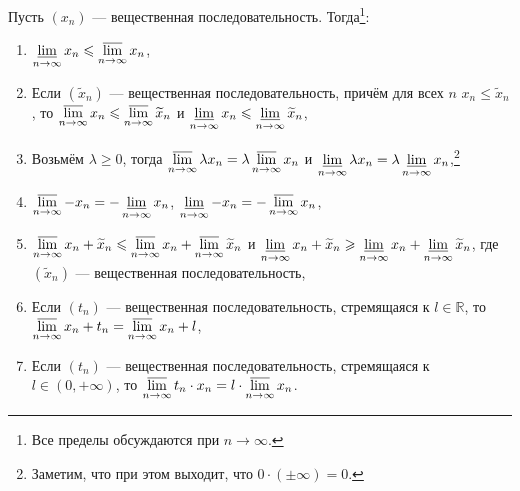\begin{theorem}
	Пусть \((x_n)\) --- вещественная последовательность. Тогда\footnote{Все пределы обсуждаются при \(n \to \infty\).}:
	\begin{enumerate}
		\item \(\varliminf\limits_{n \to \infty} x_n \leqslant \varlimsup\limits_{n \to \infty} x_n\),
		\item Если \((\widetilde{x}_n)\) --- вещественная последовательность, причём для всех \(n\) \(x_n \leqslant \widetilde{x}_n\), то \(\varlimsup\limits_{n \to \infty} x_n \leqslant \varlimsup\limits_{n \to \infty} \widetilde{x}_n\) и \(\varliminf\limits_{n \to \infty} x_n \leqslant \varliminf\limits_{n \to \infty} \widetilde{x}_n\),
		\item Возьмём \(\lambda \geqslant 0\), тогда \(\varlimsup\limits_{n \to \infty} \lambda x_n = \lambda \varlimsup\limits_{n \to \infty} x_n\) и \(\varliminf\limits_{n \to \infty} \lambda x_n = \lambda \varliminf\limits_{n \to \infty} x_n\),\footnote{Заметим, что при этом выходит, что \(0 \cdot (\pm \infty) = 0\).}
		\item \(\varlimsup\limits_{n \to \infty} -x_n = -\varliminf\limits_{n \to \infty} x_n\), \(\varliminf\limits_{n \to \infty} -x_n = -\varlimsup\limits_{n \to \infty} x_n\),
		\item \(\varlimsup\limits_{n \to \infty} x_n + \widetilde{x}_n \leqslant \varlimsup\limits_{n \to \infty} x_n + \varlimsup\limits_{n \to \infty} \widetilde{x}_n\) и \(\varliminf\limits_{n \to \infty} x_n + \widetilde{x}_n \geqslant \varliminf\limits_{n \to \infty} x_n + \varliminf\limits_{n \to \infty} \widetilde{x}_n\), где \((\widetilde{x}_n)\) --- вещественная последовательность,
		\item Если \((t_n)\) --- вещественная последовательность, стремящаяся к \(l \in \mathbb{R}\), то \(\varlimsup\limits_{n \to \infty} x_n + t_n = \varlimsup\limits_{n \to \infty} x_n + l\),
		\item Если \((t_n)\) --- вещественная последовательность, стремящаяся к \(l \in (0, +\infty)\), то \(\varlimsup\limits_{n \to \infty} t_n \cdot x_n = l \cdot \varlimsup\limits_{n \to \infty} x_n\).
	\end{enumerate}
\end{theorem}

